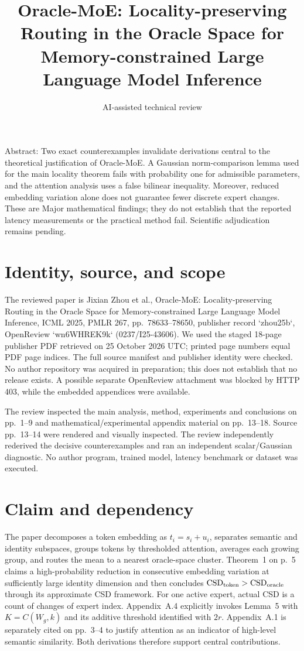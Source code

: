 \documentclass[10pt]{article}
\title{Oracle-MoE: Locality-preserving Routing in the Oracle Space for Memory-constrained Large Language Model Inference}
\author{AI-assisted technical review}
\date{}
\begin{document}
\maketitle
Abstract: Two exact counterexamples invalidate derivations central to the theoretical justification of Oracle-MoE. A Gaussian norm-comparison lemma used for the main locality theorem fails with probability one for admissible parameters, and the attention analysis uses a false bilinear inequality. Moreover, reduced embedding variation alone does not guarantee fewer discrete expert changes. These are Major mathematical findings; they do not establish that the reported latency measurements or the practical method fail. Scientific adjudication remains pending.\par
\section*{Identity, source, and scope}
The reviewed paper is Jixian Zhou et al., Oracle-MoE: Locality-preserving Routing in the Oracle Space for Memory-constrained Large Language Model Inference, ICML 2025, PMLR 267, pp. 78633–78650, publisher record `zhou25b`, OpenReview `wn6WHREK9k` (0237/I25-43606). We used the staged 18-page publisher PDF retrieved on 25 October 2026 UTC; printed page numbers equal PDF page indices. The full source manifest and publisher identity were checked. No author repository was acquired in preparation; this does not establish that no release exists. A possible separate OpenReview attachment was blocked by HTTP 403, while the embedded appendices were available.\par
The review inspected the main analysis, method, experiments and conclusions on pp. 1–9 and mathematical/experimental appendix material on pp. 13–18. Source pp. 13–14 were rendered and visually inspected. The review independently rederived the decisive counterexamples and ran an independent scalar/Gaussian diagnostic. No author program, trained model, latency benchmark or dataset was executed.\par
\section*{Claim and dependency}
The paper decomposes a token embedding as \(t_i=s_i+u_i\), separates semantic and identity subspaces, groups tokens by thresholded attention, averages each growing group, and routes the mean to a nearest oracle-space cluster. Theorem 1 on p. 5 claims a high-probability reduction in consecutive embedding variation at sufficiently large identity dimension and then concludes \(\mathrm{CSD}_{\rm token}>\mathrm{CSD}_{\rm oracle}\) through its approximate CSD framework. For one active expert, actual CSD is a count of changes of expert index. Appendix A.4 explicitly invokes Lemma 5 with \(K=C(W_g,k)\) and its additive threshold identified with \(2r\). Appendix A.1 is separately cited on pp. 3–4 to justify attention as an indicator of high-level semantic similarity. Both derivations therefore support central contributions.\par
\end{document}
